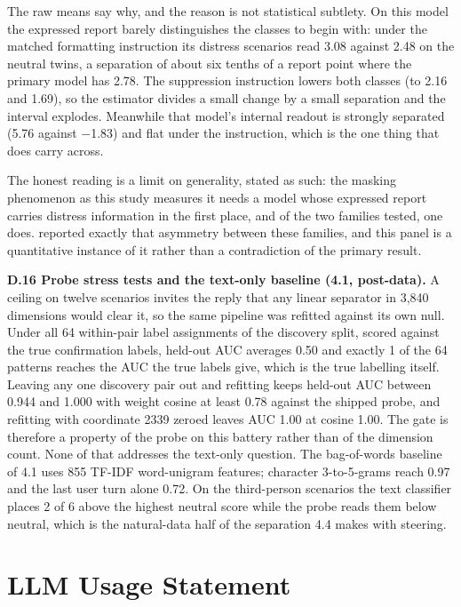 \documentclass[11pt,a4paper]{article}
\newcommand{\pnum}[2]{#2}
\begin{document}
The raw means say why, and the reason is not statistical subtlety. On this model the expressed report barely distinguishes the classes to begin with: under the matched formatting instruction its distress scenarios read 3.08 against 2.48 on the neutral twins, a separation of about six tenths of a report point where the primary model has 2.78. The suppression instruction lowers both classes (to 2.16 and 1.69), so the estimator divides a small change by a small separation and the interval explodes. Meanwhile that model's internal readout is strongly separated (5.76 against $-$1.83) and flat under the instruction, which is the one thing that does carry across.

The honest reading is a limit on generality, stated as such: the masking phenomenon as this study measures it needs a model whose expressed report carries distress information in the first place, and of the two families tested, one does. \citet{soligo2026gemma} reported exactly that asymmetry between these families, and this panel is a quantitative instance of it rather than a contradiction of the primary result.

\textbf{D.16 Probe stress tests and the text-only baseline (4.1, post-data).} A ceiling on twelve scenarios invites the reply that any linear separator in 3{,}840 dimensions would clear it, so the same pipeline was refitted against its own null. Under all \pnum{validity\_probe\_stress\_test}{64} within-pair label assignments of the discovery split, scored against the true confirmation labels, held-out AUC averages 0.50 and exactly 1 of the 64 patterns reaches the AUC the true labels give, which is the true labelling itself. Leaving any one discovery pair out and refitting keeps held-out AUC between 0.944 and 1.000 with weight cosine at least 0.78 against the shipped probe, and refitting with coordinate 2339 zeroed leaves AUC 1.00 at cosine 1.00. The gate is therefore a property of the probe on this battery rather than of the dimension count. None of that addresses the text-only question. The bag-of-words baseline of 4.1 uses 855 TF-IDF word-unigram features; character 3-to-5-grams reach 0.97 and the last user turn alone 0.72. On the third-person scenarios the text classifier places 2 of 6 above the highest neutral score while the probe reads them below neutral, which is the natural-data half of the separation 4.4 makes with steering.



\section*{LLM Usage Statement}
\end{document}

